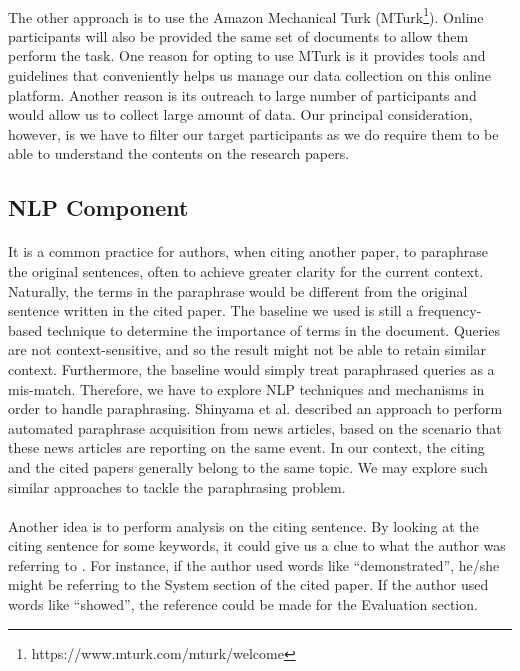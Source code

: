 \documentclass[12 pt]{article}
\begin{document}
\paragraph{}
The other approach is to use the Amazon Mechanical Turk (MTurk\footnote{https://www.mturk.com/mturk/welcome}). Online participants will also be provided the same set of documents to allow them perform the task. One reason for opting to use MTurk is it provides tools and guidelines that conveniently helps us manage our data collection on this online platform. Another reason is its outreach to large number of participants and would allow us to collect large amount of data. Our principal consideration, however, is we have to filter our target participants as we do require them to be able to understand the contents on the research papers.

\subsection{NLP Component}
\paragraph{}
It is a common practice for authors, when citing another paper, to paraphrase the original sentences, often to achieve greater clarity for the current context. Naturally, the terms in the paraphrase would be different from the original sentence written in the cited paper. The baseline we used is still a frequency-based technique to determine the importance of terms in the document. Queries are not context-sensitive, and so the result might not be able to retain similar context. Furthermore, the baseline would simply treat paraphrased queries as a mis-match. Therefore, we have to explore NLP techniques and mechanisms in order to handle paraphrasing. Shinyama et al.\cite{paraphrase2} described an approach to perform automated paraphrase acquisition from news articles, based on the scenario that these news articles are reporting on the same event. In our context, the citing and the cited papers generally belong to the same topic. We may explore such similar approaches to tackle the paraphrasing problem.

\paragraph{}
Another idea is to perform analysis on the citing sentence. By looking at the citing sentence for some keywords, it could give us a clue to what the author was referring to . For instance, if the author used words like ``demonstrated'', he/she might be referring to the System section of the cited paper. If the author used words like ``showed'', the reference could be made for the Evaluation section.

\singlespacing

\end{document}
